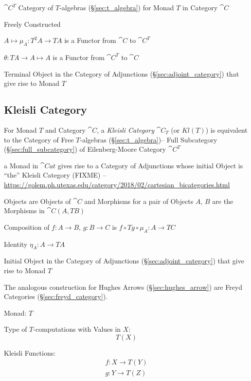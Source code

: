 $\cat{C}^T$ Category of $T$-algebras (\S\ref{sec:t_algebra}) for
Monad $T$ in Category $\cat{C}$

Freely Constructed

$A \mapsto \mu_A : T^2 A \rightarrow T A$ is a Functor from
$\cat{C}$ to $\cat{C}^T$

$\theta : T A \rightarrow A \mapsto A$ is a Functor from
$\cat{C}^T$ to $\cat{C}$

Terminal Object in the Category of Adjunctions
(\S\ref{sec:adjoint_category}) that give rise to Monad $T$



\subsection{Kleisli Category}\label{sec:kleisli_category}

For Monad $T$ and Category $\cat{C}$, a \emph{Kleisli Category}
$\cat{C}_T$ (or $Kl(T)$) is equivalent to the Category of Free
$T$-algebras (\S\ref{sec:t_algebra})-- Full Subcategory
(\S\ref{sec:full_subcategory}) of Eilenberg-Moore Category
$\cat{C}^T$

a Monad in $\cat{Cat}$ gives rise to a Category of Adjunctions whose initial
Object is ``the'' Kleisli Category (FIXME)
--\url{https://golem.ph.utexas.edu/category/2018/02/cartesian_bicategories.html}

Objects are Objects of $\cat{C}$ and Morphisms for a pair of
Objects $A$, $B$ are the Morphisms in $\cat{C}(A, T B)$

Composition of $f : A \rightarrow B$, $g : B \rightarrow C$ is $f
\circ T g \circ \mu_A : A \rightarrow TC$

Identity $\eta_A : A \rightarrow T A$

Initial Object in the Category of Adjunctions
(\S\ref{sec:adjoint_category}) that give rise to Monad $T$

The analogous construction for Hughes Arrows
(\S\ref{sec:hughes_arrow}) are Freyd Categories
(\S\ref{sec:freyd_category}).

Monad: $T$

Type of $T$-computations with Values in $X$:
\[
  T (X)
\]

Kleisli Functions:
\[
\begin{split}
  f : X \rightarrow T(Y) \\
  g : Y \rightarrow T(Z)
\end{split}
\]


